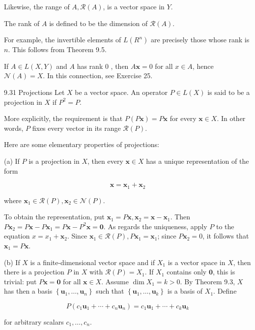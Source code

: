 \documentclass[10pt]{article}
\begin{document}
Likewise, the range of $A, \mathscr{R}(A)$, is a vector space in $Y$.

The rank of $A$ is defined to be the dimension of $\mathscr{R}(A)$.

For example, the invertible elements of $L\left(R^{n}\right)$ are precisely those whose rank is $n$. This follows from Theorem 9.5.

If $A \in L(X, Y)$ and $A$ has rank 0 , then $A \mathbf{x}=0$ for all $x \in A$, hence $\mathcal{N}(A)=X$. In this connection, see Exercise 25.

9.31 Projections Let $X$ be a vector space. An operator $P \in L(X)$ is said to be a projection in $X$ if $P^{2}=P$.

More explicitly, the requirement is that $P(P \mathbf{x})=P \mathbf{x}$ for every $\mathbf{x} \in X$. In other words, $P$ fixes every vector in its range $\mathscr{R}(P)$.

Here are some elementary properties of projections:

(a) If $P$ is a projection in $X$, then every $\mathbf{x} \in X$ has a unique representation of the form

$$
\mathbf{x}=\mathbf{x}_{1}+\mathbf{x}_{2}
$$

where $\mathbf{x}_{1} \in \mathscr{R}(P), \mathbf{x}_{2} \in \mathscr{N}(P)$.

To obtain the representation, put $\mathbf{x}_{1}=P \mathbf{x}, \mathbf{x}_{2}=\mathbf{x}-\mathbf{x}_{1}$. Then $P \mathbf{x}_{2}=P \mathbf{x}-P \mathbf{x}_{1}=P \mathbf{x}-P^{2} \mathbf{x}=\mathbf{0}$. As regards the uniqueness, apply $P$ to the equation $x=x_{1}+\mathbf{x}_{2}$. Since $\mathbf{x}_{1} \in \mathscr{R}(P), P \mathbf{x}_{1}=\mathbf{x}_{1}$; since $P \mathbf{x}_{2}=0$, it follows that $\mathbf{x}_{1}=P \mathbf{x}$.

(b) If $X$ is a finite-dimensional vector space and if $X_{1}$ is a vector space in $X$, then there is a projection $P$ in $X$ with $\mathscr{R}(P)=X_{1}$. If $X_{1}$ contains only $\mathbf{0}$, this is trivial: put $P \mathbf{x}=\mathbf{0}$ for all $\mathbf{x} \in X$. Assume $\operatorname{dim} X_{1}=k>0$. By Theorem 9.3, $X$ has then a basis $\left\{\mathbf{u}_{1}, \ldots, \mathbf{u}_{n}\right\}$ such that $\left\{\mathbf{u}_{1}, \ldots, \mathbf{u}_{k}\right\}$ is a basis of $X_{1}$. Define

$$
P\left(c_{1} \mathbf{u}_{1}+\cdots+c_{n} \mathbf{u}_{n}\right)=c_{1} \mathbf{u}_{1}+\cdots+c_{k} \mathbf{u}_{k}
$$

for arbitrary scalars $c_{1}, \ldots, c_{n}$.
\end{document}
